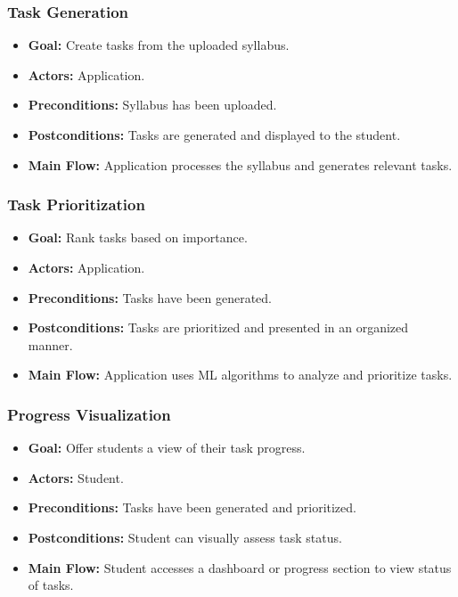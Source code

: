 \documentclass[12pt]{article}
\begin{document}
\subsubsection{Task Generation}
\begin{itemize}
    \item \textbf{Goal:} Create tasks from the uploaded syllabus.
    \item \textbf{Actors:} Application.
    \item \textbf{Preconditions:} Syllabus has been uploaded.
    \item \textbf{Postconditions:} Tasks are generated and displayed to the student.
    \item \textbf{Main Flow:} Application processes the syllabus and generates relevant tasks.
\end{itemize}

\subsubsection{Task Prioritization}
\begin{itemize}
    \item \textbf{Goal:} Rank tasks based on importance.
    \item \textbf{Actors:} Application.
    \item \textbf{Preconditions:} Tasks have been generated.
    \item \textbf{Postconditions:} Tasks are prioritized and presented in an organized manner.
    \item \textbf{Main Flow:} Application uses ML algorithms to analyze and prioritize tasks.
\end{itemize}

\subsubsection{Progress Visualization}
\begin{itemize}
    \item \textbf{Goal:} Offer students a view of their task progress.
    \item \textbf{Actors:} Student.
    \item \textbf{Preconditions:} Tasks have been generated and prioritized.
    \item \textbf{Postconditions:} Student can visually assess task status.
    \item \textbf{Main Flow:} Student accesses a dashboard or progress section to view status of tasks.
\end{itemize}
\end{document}

